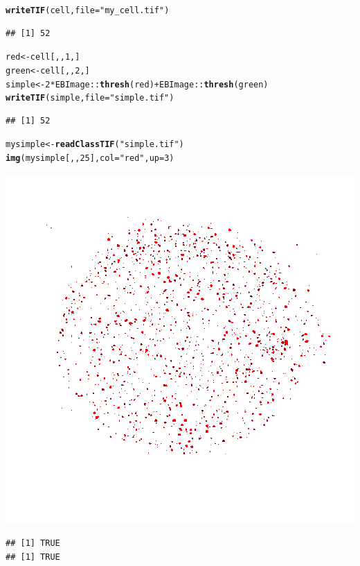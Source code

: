 \documentclass{article}\usepackage[]{graphicx}\usepackage[]{color}
\makeatletter
\def\maxwidth{ %
  \ifdim\Gin@nat@width>\linewidth
    \linewidth
  \else
    \Gin@nat@width
  \fi
}
\newcommand{\hlnum}[1]{\textcolor[rgb]{0.686,0.059,0.569}{#1}}%
\newcommand{\hlstr}[1]{\textcolor[rgb]{0.192,0.494,0.8}{#1}}%
\newcommand{\hlopt}[1]{\textcolor[rgb]{0,0,0}{#1}}%
\newcommand{\hlstd}[1]{\textcolor[rgb]{0.345,0.345,0.345}{#1}}%
\newcommand{\hlkwb}[1]{\textcolor[rgb]{0.69,0.353,0.396}{#1}}%
\newcommand{\hlkwc}[1]{\textcolor[rgb]{0.333,0.667,0.333}{#1}}%
\newcommand{\hlkwd}[1]{\textcolor[rgb]{0.737,0.353,0.396}{\textbf{#1}}}%
\newenvironment{kframe}{%
 \def\at@end@of@kframe{}%
 \ifinner\ifhmode%
  \def\at@end@of@kframe{\end{minipage}}%
  \begin{minipage}{\columnwidth}%
 \fi\fi%
 \def\FrameCommand##1{\hskip\@totalleftmargin \hskip-\fboxsep
 \colorbox{shadecolor}{##1}\hskip-\fboxsep
     \hskip-\linewidth \hskip-\@totalleftmargin \hskip\columnwidth}%
 \MakeFramed {\advance\hsize-\width
   \@totalleftmargin\z@ \linewidth\hsize
   \@setminipage}}%
 {\par\unskip\endMakeFramed%
 \at@end@of@kframe}
\newenvironment{knitrout}{}{} %
\makeatother
\begin{document}
\begin{knitrout}
\color{fgcolor}\begin{kframe}
\begin{alltt}
\hlkwd{writeTIF}\hlstd{(cell,} \hlkwc{file}\hlstd{=}\hlstr{"my_cell.tif"}\hlstd{)}
\end{alltt}
\begin{verbatim}
## [1] 52
\end{verbatim}
\begin{alltt}
\hlstd{red} \hlkwb{<-} \hlstd{cell[,,}\hlnum{1}\hlstd{,]}
\hlstd{green} \hlkwb{<-} \hlstd{cell[,,}\hlnum{2}\hlstd{,]}
\hlstd{simple} \hlkwb{<-} \hlnum{2}\hlopt{*}\hlstd{EBImage}\hlopt{::}\hlkwd{thresh}\hlstd{(red)}\hlopt{+}\hlstd{EBImage}\hlopt{::}\hlkwd{thresh}\hlstd{(green)}
\hlkwd{writeTIF}\hlstd{(simple,} \hlkwc{file}\hlstd{=}\hlstr{"simple.tif"}\hlstd{)}
\end{alltt}
\begin{verbatim}
## [1] 52
\end{verbatim}
\begin{alltt}
\hlstd{mysimple} \hlkwb{<-} \hlkwd{readClassTIF}\hlstd{(}\hlstr{"simple.tif"}\hlstd{)}
\hlkwd{img}\hlstd{(mysimple[,,}\hlnum{25}\hlstd{],}\hlkwc{col}\hlstd{=}\hlstr{"red"}\hlstd{,}\hlkwc{up}\hlstd{=}\hlnum{3}\hlstd{)}
\end{alltt}
\end{kframe}
\includegraphics[width=\maxwidth]{figure/unnamed-chunk-4-1} 

\end{knitrout}
\begin{knitrout}
\color{fgcolor}\begin{kframe}
\begin{verbatim}
## [1] TRUE
## [1] TRUE
\end{verbatim}
\end{kframe}
\end{knitrout}
\end{document}
